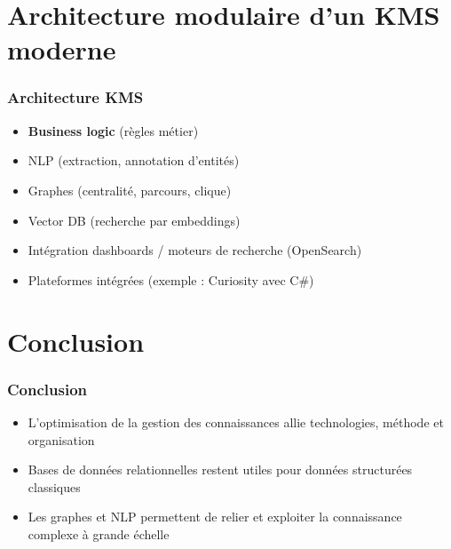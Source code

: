 \documentclass{beamer}
\begin{document}
\section{Architecture modulaire d’un KMS moderne}

\begin{frame}
  \frametitle{Architecture KMS}
  \begin{itemize}
    \item \textbf{Business logic} (règles métier)
    \item NLP (extraction, annotation d’entités)
    \item Graphes (centralité, parcours, clique)
    \item Vector DB (recherche par embeddings)
    \item Intégration dashboards / moteurs de recherche (OpenSearch)
    \item Plateformes intégrées (exemple : Curiosity avec C\#)
  \end{itemize}
\end{frame}

\section*{Conclusion}

\begin{frame}
  \frametitle{Conclusion}
  \begin{itemize}
    \item L’optimisation de la gestion des connaissances allie technologies, méthode et organisation
    \item Bases de données relationnelles restent utiles pour données structurées classiques
    \item Les graphes et NLP permettent de relier et exploiter la connaissance complexe à grande échelle
  \end{itemize}
\end{frame}
\end{document}

